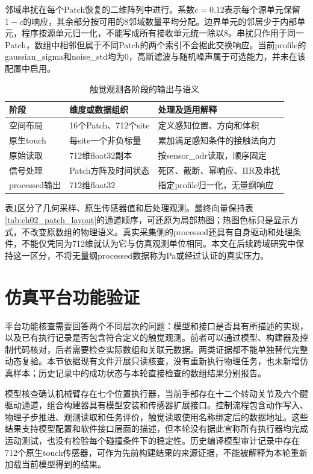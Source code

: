 邻域串扰在每个Patch恢复的二维阵列中进行。系数$c=0.12$表示每个源单元保留$1-c$的响应，其余部分按可用的8邻域数量平均分配。边界单元的邻居少于内部单元，程序按源单元归一化，不能写成所有接收单元统一除以8。串扰只作用于同一Patch，数组中相邻但属于不同Patch的两个索引不会据此交换响应。当前profile的gaussian\_sigma和noise\_std均为0，高斯滤波与随机噪声属于可选能力，并未在该配置中启用。

\begin{table}[htbp]
  \centering\small
  \caption{触觉观测各阶段的输出与语义}
  \label{tab:ch02_signal_stages}
  \begin{tabular}{p{}p{}p{}}
    \hline
    阶段 & 维度或数据组织 & 处理及适用解释\\
    \hline
    空间布局 & 16个Patch、712个site & 定义感知位置、方向和体积\\
    原生touch & 每site一个非负标量 & 累加满足感知条件的接触法向力\\
    原始读取 & 712维float32副本 & 按sensor\_adr读取，顺序固定\\
    信号处理 & Patch方阵及时间状态 & 死区、截断、幂响应、IIR及串扰\\
    processed输出 & 712维float32 & 指定profile归一化，无量纲响应\\
    \hline
  \end{tabular}
\end{table}

表\ref{tab:ch02_signal_stages}区分了几何采样、原生传感器值和后处理观测。最终向量保持表\ref{tab:ch02_patch_layout}的通道顺序，可还原为局部热图；热图色标只是显示方式，不改变原数组的物理语义。真实采集侧的processed还具有自身驱动和处理条件，不能仅凭同为712维就认为它与仿真观测单位相同。本文在后续跨域研究中保持这一区分，不将无量纲processed数据称为Pa或经过认证的真实压力。

\section{仿真平台功能验证}
\label{sec:platform_validation}

平台功能核查需要回答两个不同层次的问题：模型和接口是否具有所描述的实现，以及已有执行记录是否包含符合定义的触觉观测。前者可以通过模型、构建器及控制代码核对，后者需要检查实际数组和关联元数据。两类证据都不能单独替代完整动态复验。本节依据现有文件开展只读核查，没有重新执行物理任务，也未新增仿真样本；历史记录中的成功状态与本轮直接检查的数组结果分别报告。

模型核查确认机械臂存在七个位置执行器，当前手部存在十二个转动关节及六个腱驱动通道，组合构建器具有模型安装和传感器扩展接口。控制流程包含动作写入、物理子步推进、观测读取和任务评价，触觉读取使用名称绑定后的数据地址。这些结果支持模型配置和软件接口层面的描述，但本轮没有据此宣称所有执行器均完成运动测试，也没有检验每个碰撞条件下的稳定性。历史编译模型审计记录中存在712个原生touch传感器，可作为先前构建结果的来源证据，不能被解释为本轮重新加载当前模型得到的结果。

